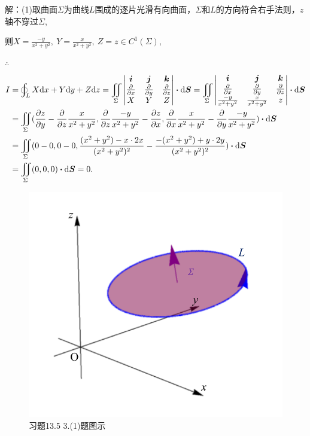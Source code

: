 \documentclass[12pt,UTF8,fleqn]{ctexart}
\newcommand{\BLOInt}[2]{\varoint\nolimits_{#1}#2}
\newcommand{\md}[1]{\mathrm d#1}
\newcommand{\BSIInt}[2]{\iint\limits_{#1}#2}
\begin{document}
\begin{enumerate}
解：(1)取曲面$\Sigma$为曲线$L$围成的逐片光滑有向曲面，$\Sigma$和$L$的方向符合右手法则，$z$轴不穿过$\Sigma$,

则$X=\frac{-y}{x^2+y^2},\ Y=\frac x{x^2+y^2},\ Z=z\in C^1(\Sigma)$,

$\therefore$
\[\begin{aligned}
I&=\BLOInt L{X\md x+Y\md y+Z\md z}=\BSIInt\Sigma{\begin{vmatrix}
\bm i&\bm j&\bm k\\
\frac\partial{\partial x}&\frac\partial{\partial y}&\frac\partial{\partial z}\\
X&Y&Z
\end{vmatrix}}\bm\cdot\md\bm S=\BSIInt\Sigma{\begin{vmatrix}
\bm i&\bm j&\bm k\\
\frac\partial{\partial x}&\frac\partial{\partial y}&\frac\partial{\partial z}\\
\frac{-y}{x^2+y^2}&\frac x{x^2+y^2}&z
\end{vmatrix}}\bm\cdot\md\bm S\\
&=\BSIInt\Sigma{(\frac{\partial z}{\partial y}-\frac\partial{\partial z}\frac x{x^2+y^2},\frac\partial{\partial z}\frac{-y}{x^2+y^2}-\frac{\partial z}{\partial x},\frac\partial{\partial x}\frac x{x^2+y^2}-\frac\partial{\partial y}\frac{-y}{x^2+y^2})\bm\cdot\md\bm S}\\
&=\BSIInt\Sigma{(0-0,0-0,\frac{(x^2+y^2)-x\cdot2x}{(x^2+y^2)^2}-\frac{-(x^2+y^2)+y\cdot2y}{(x^2+y^2)^2})\bm\cdot\md\bm S}\\
&=\BSIInt\Sigma{(0,0,0)\bm\cdot\md\bm S}=0.
\end{aligned}\]
\begin{figure}[H]
\begin{center}
\includegraphics[height=0.5\textheight]{Figures24/Fig13-5-3-1.pdf}
\end{center}
\caption{习题13.5 3.(1)题图示}
\label{13-5-3-1}
\end{figure}


\end{enumerate}
\end{document}
